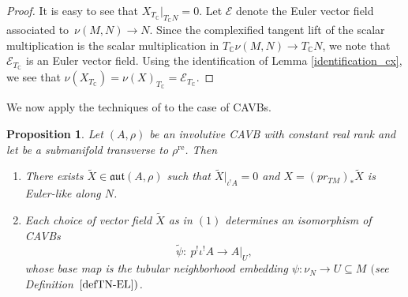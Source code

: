 \documentclass[pdftex]{sigma}
\numberwithin{equation}{section}
\newtheorem{Proposition}[Theorem]{Proposition}
 { \theoremstyle{definition}
\newtheorem{Definition}[Theorem]{Definition}
\newtheorem{Note}[Theorem]{Note}
\newtheorem{Example}[Theorem]{Example}
\newtheorem{Examples}[Theorem]{Examples}
\newtheorem{Remark}[Theorem]{Remark} }
\newcommand{\C}{{\mathbb{C}}}
\DeclareMathOperator{\real}{re}
\begin{document}
\begin{proof}
   It is easy to see that $X_{T_{\C}}|_{T_{\C}N}=0$. Let $\mathcal{E}$ denote the Euler vector field associated to~${\nu(M,N)\rightarrow N}$. Since the complexified tangent lift of the scalar multiplication is the scalar multiplication in $T_{\C}\nu(M,N)\to T_{\C}N$, we note that $\mathcal{E}_{T_{\C}}$ is an Euler vector field. Using the identification of Lemma \ref{identification_cx}, we see that $\nu(X_{T_{\C}})=\nu(X)_{T_{\C}}=\mathcal{E}_{T_{\C}}$.
\end{proof}

We now apply the techniques of \cite{bursztyn2019splitting} to the case of CAVBs.
\begin{Proposition}\label{splitting_cavb}
Let $(A,\rho)$ be an involutive CAVB with constant real rank and let  be a submanifold transverse to $\rho^{\real}$. Then
\begin{enumerate}\itemsep=0pt
\item[$1.$] There exists $\widetilde{X}\in \mathfrak{aut}(A,\rho)$ such that $\widetilde{X}|_{\iota^! A}=0$ and $X={(pr_{TM})}_* \widetilde{X}$ is Euler-like along $N$.
\item[$2.$] Each choice of vector field $\widetilde{X}$ as in $(1)$ determines an isomorphism of CAVBs
\[
\widetilde{\psi}\colon\ p^! \iota^! A \to A|_U,
\]
whose base map is the tubular neighborhood embedding $\psi\colon \nu_N\to U\subseteq M$ $($see Definition~$\ref{defTN-EL})$.
\end{enumerate}
\end{Proposition}
\end{document}

